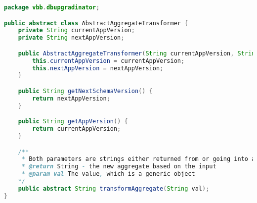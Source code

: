 \begin{lstlisting}[language=Java, label=ag, caption={Klassen \emph{AbstractAggregateTransformer}, hvis hovedansvar er å lage en ny streng ut fra et gitt strengargument i funksjonen \emph{transformAggregate}, som programvareutvikleren selv må implementere.}]
package vbb.dbupgradinator;

public abstract class AbstractAggregateTransformer {
    private String currentAppVersion;
    private String nextAppVersion;

    public AbstractAggregateTransformer(String currentAppVersion, String nextAppVersion) {
        this.currentAppVersion = currentAppVersion;
        this.nextAppVersion = nextAppVersion;
    }

    public String getNextSchemaVersion() {
        return nextAppVersion;
    }

    public String getAppVersion() {
        return currentAppVersion;
    }

    /**
     * Both parameters are strings either returned from or going into a DB query
     * @return String - the new aggregate based on the input
     * @param val The value, which is a generic object
    */
    public abstract String transformAggregate(String val);
}
\end{lstlisting}
